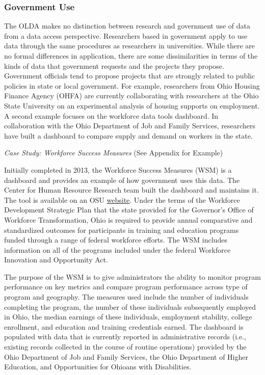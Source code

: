 \documentclass[
]{book}
\begin{document}
\hypertarget{government-use}{%
\subsubsection*{Government Use}\label{government-use}}

The OLDA makes no distinction between research and government use of data from a data access perspective. Researchers based in government apply to use data through the same procedures as researchers in universities. While there are no formal differences in application, there are some dissimilarities in terms of the kinds of data that government requests and the projects they propose. Government officials tend to propose projects that are strongly related to public policies in state or local government. For example, researchers from Ohio Housing Finance Agency (OHFA) are currently collaborating with researchers at the Ohio State University on an experimental analysis of housing supports on employment. A second example focuses on the workforce data tools dashboard. In collaboration with the Ohio Department of Job and Family Services, researchers have built a dashboard to compare supply and demand on workers in the state.

\emph{Case Study: Workforce Success Measures} (See Appendix for Example)

Initially completed in 2013, the Workforce Success Measures (WSM) is a dashboard and provides an example of how government uses this data. The Center for Human Resource Research team built the dashboard and maintains it. The tool is available on an OSU \href{https://workforcesuccess.chrr.ohio-state.edu/home}{website}. Under the terms of the Workforce Development Strategic Plan that the state provided for the Governor's Office of Workforce Transformation, Ohio is required to provide annual comparative and standardized outcomes for participants in training and education programs funded through a range of federal workforce efforts. The WSM includes information on all of the programs included under the federal Workforce Innovation and Opportunity Act.

The purpose of the WSM is to give administrators the ability to monitor program performance on key metrics and compare program performance across type of program and geography. The measures used include the number of individuals completing the program, the number of these individuals subsequently employed in Ohio, the median earnings of these individuals, employment stability, college enrollment, and education and training credentials earned. The dashboard is populated with data that is currently reported in administrative records (i.e., existing records collected in the course of routine operations) provided by the Ohio Department of Job and Family Services, the Ohio Department of Higher Education, and Opportunities for Ohioans with Disabilities.
\end{document}
